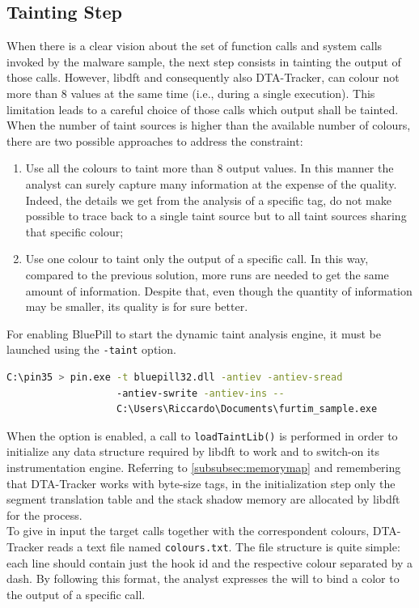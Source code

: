\documentclass[LaM,binding=0.6cm]{sapthesis}
\begin{document}
\subsection{Tainting Step}
\label{subsec:taintingstep}
When there is a clear vision about the set of function calls and system calls invoked by the malware sample, the next step consists in tainting the output of those calls. However, libdft and consequently also {\sf DTA-Tracker}, can colour not more than $8$ values at the same time (i.e., during a single execution). This limitation leads to a careful choice of those calls which output shall be tainted. When the number of taint sources is higher than the available number of colours, there are two possible approaches to address the constraint:
\begin{enumerate}
\item Use all the colours to taint more than $8$ output values. In this manner the analyst can surely capture many information at the expense of the quality. Indeed, the details we get from the analysis of a specific tag, do not make possible to trace back to a single taint source but to all taint sources sharing that specific colour;
\item Use one colour to taint only the output of a specific call. In this way, compared to the previous solution, more runs are needed to get the same amount of information. Despite that, even though the quantity of information may be smaller, its quality is for sure better.
\end{enumerate}
For enabling BluePill to start the dynamic taint analysis engine, it must be launched using the \texttt{-taint} option.
\begin{lstlisting}[language=bash]
C:\pin35 > pin.exe -t bluepill32.dll -antiev -antiev-sread 
				   -antiev-swrite -antiev-ins -- 
				   C:\Users\Riccardo\Documents\furtim_sample.exe
\end{lstlisting}
When the option is enabled, a call to \texttt{loadTaintLib()} is performed in order to initialize any data structure required by libdft to work and to switch-on its instrumentation engine. Referring to \autoref{subsubsec:memorymap} and remembering that {\sf DTA-Tracker} works with byte-size tags, in the initialization step only the segment translation table and the stack shadow memory are allocated by libdft for the process.\\

To give in input the target calls together with the correspondent colours, {\sf DTA-Tracker} reads a text file named \texttt{colours.txt}. The file structure is quite simple: each line should contain just the hook id and the respective colour separated by a dash. By following this format, the analyst expresses the will to bind a color to the output of a specific call.
\end{document}
